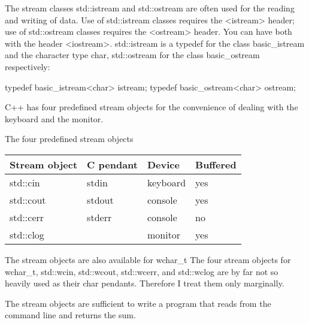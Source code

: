 
The stream classes std::istream and std::ostream are often used for the reading and writing of data. Use of std::istream classes requires the <istream> header; use of std::ostream classes requires the <ostream> header. You can have both with the header <iostream>. std::istream is a typedef for the class basic\_istream and the character type char, std::ostream for the class basic\_ostream respectively:

\begin{cpp}
typedef basic_istream<char> istream;
typedef basic_ostream<char> ostream;
\end{cpp}

C++ has four predefined stream objects for the convenience of dealing with the keyboard and the monitor.

\begin{center}
The four predefined stream objects
\end{center}

\begin{longtable}[c]{|l|l|l|l|}
\hline
\textbf{Stream object} & \textbf{C pendant} & \textbf{Device} & \textbf{Buffered} \\ \hline
\endfirsthead
%
\endhead
%
std::cin               & stdin              & keyboard        & yes               \\ \hline
std::cout              & stdout             & console         & yes               \\ \hline
std::cerr              & stderr             & console         & no                \\ \hline
std::clog              &                    & monitor         & yes               \\ \hline
\end{longtable}


\begin{myNotic}{The stream objects are also available for wchar\_t}
The four stream objects for wchar\_t, std::wcin, std::wcout, std::wcerr, and std::wclog are by far not so heavily used as their char pendants. Therefore I treat them only marginally.
\end{myNotic}

The stream objects are sufficient to write a program that reads from the command line and returns the sum.

